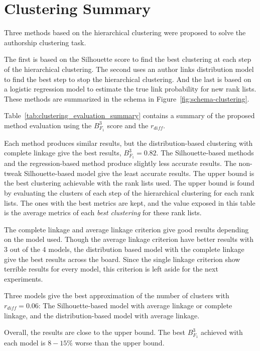 \section{Clustering Summary}

Three methods based on the hierarchical clustering were proposed to solve the authorship clustering task.

The first is based on the Silhouette score to find the best clustering at each step of the hierarchical clustering.
The second uses an author links distribution model to find the best step to stop the hierarchical clustering.
And the last is based on a logistic regression model to estimate the true link probability for new rank lists.
These methods are summarized in the schema in Figure~\ref{fig:schema-clustering}.

Table~\ref{tab:clustering_evaluation_summary} contains a summary of the proposed method evaluation using the $B^3_{F_1}$ score and the $r_{diff}$.

Each method produces similar results, but the distribution-based clustering with complete linkage give the best results, $B^3_{F_1} = 0.82$.
The Silhouette-based methods and the regression-based method produce slightly less accurate results.
The non-tweak Silhouette-based model give the least accurate results.
The upper bound is the best clustering achievable with the rank lists used.
The upper bound is found by evaluating the clusters of each step of the hierarchical clustering for each rank lists.
The ones with the best metrics are kept, and the value exposed in this table is the average metrics of each \textit{best clustering} for these rank lists.

The complete linkage and average linkage criterion give good results depending on the model used.
Though the average linkage criterion have better results with 3 out of the 4 models, the distribution based model with the complete linkage give the best results across the board.
Since the single linkage criterion show terrible results for every model, this criterion is left aside for the next experiments.

Three models give the best approximation of the number of clusters with $r_{diff} = 0.06$:
The Silhouette-based model with average linkage or complete linkage, and the distribution-based model with average linkage.

Overall, the results are close to the upper bound.
The best $B^{3}_{F_1}$ achieved with each model is $8-15\%$ worse than the upper bound.

